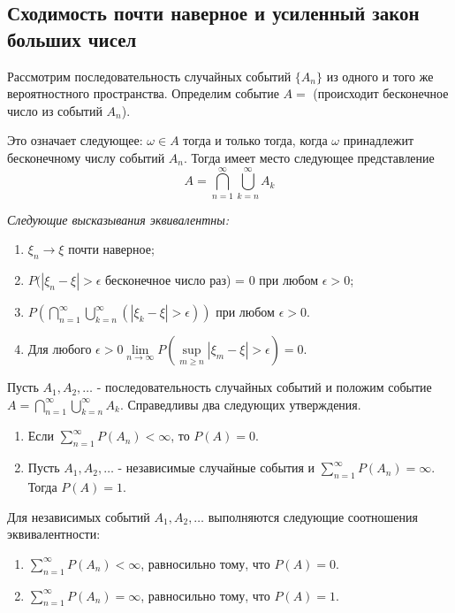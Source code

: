 \subsection{Сходимость почти наверное и усиленный закон больших чисел}

Рассмотрим последовательность случайных событий $\{ A_n \}$ из одного и того же вероятностного пространства. Определим событие $A = $ (происходит бесконечное число из событий $A_n$).

Это означает следующее: $\omega \in A$ тогда и только тогда, когда $\omega$ принадлежит бесконечному числу событий $A_n$. Тогда имеет место следующее представление
\[ A = \bigcap_{n=1}^{\infty} \bigcup_{k=n}^{\infty} A_k \]

\textit{Следующие высказывания эквивалентны:}

\begin{enumerate}
	\item $\xi_n \to \xi$ почти наверное;
	\item $P(|\xi_n - \xi| > \epsilon$ бесконечное число раз) = 0 при любом $\epsilon > 0$;
	\item $P \left( \bigcap\limits_{n=1}^{\infty} \bigcup\limits_{k=n}^{\infty} (|\xi_k - \xi| > \epsilon) \right)$ при любом $\epsilon > 0$.
	\item Для любого $\epsilon > 0 \lim\limits_{n \to \infty} P(\sup\limits_{m \ge n} |\xi_m - \xi| > \epsilon) = 0$.
\end{enumerate}

\begin{lemma}
	Пусть $A_1, A_2, \dots$ - последовательность случайных событий и положим событие $A = \bigcap\limits_{n=1}^{\infty} \bigcup\limits_{k=n}^{\infty} A_k $. Справедливы два следующих утверждения.
	\begin{enumerate}
		\item Если $\sum\limits_{n=1}^{\infty} P(A_n) < \infty$, то $P(A) = 0$.
		\item Пусть $A_1, A_2, \dots$ - независимые случайные события и $\sum\limits_{n=1}^{\infty} P(A_n) = \infty$. Тогда $P(A) = 1$.
	\end{enumerate}
\end{lemma}

\begin{corollary}
	Для независимых событий $A_1, A_2, \dots$ выполняются следующие соотношения эквивалентности:
	\begin{enumerate}
		\item $\sum\limits_{n=1}^{\infty} P(A_n) < \infty$, равносильно тому, что $P(A) = 0$.
		\item $\sum\limits_{n=1}^{\infty} P(A_n) = \infty$, равносильно тому, что $P(A) = 1$.
	\end{enumerate}
\end{corollary}

